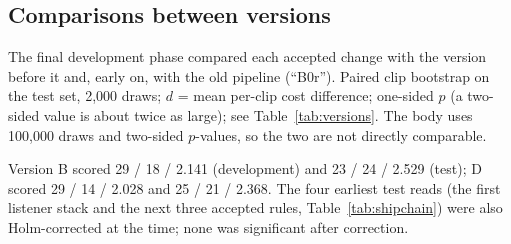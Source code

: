 \subsection{Comparisons between versions}\label{app:versions}
The final development phase compared each accepted change with the version before it and, early on, with the
old pipeline (``B0r''). Paired clip bootstrap on the test set, 2{,}000 draws; $d$ = mean per-clip cost difference;
one-sided $p$ (a two-sided value is about twice as large); see Table~\ref{tab:versions}. The body uses 100{,}000 draws and two-sided $p$-values, so the two are not directly comparable.
\begin{table}[tbp]\centering\small
\caption{Comparisons between versions (test set, one-sided). Test-set reads made during development, uncorrected
for multiplicity; none was used to accept a change.}\label{tab:versions}
\end{table}
Version B scored 29 / 18 / 2.141 (development) and 23 / 24 / 2.529 (test); D scored 29 / 14 / 2.028 and
25 / 21 / 2.368. The four earliest test reads (the first listener stack and the next three accepted rules, Table~\ref{tab:shipchain}) were also
Holm-corrected at the time; none was significant after correction.

